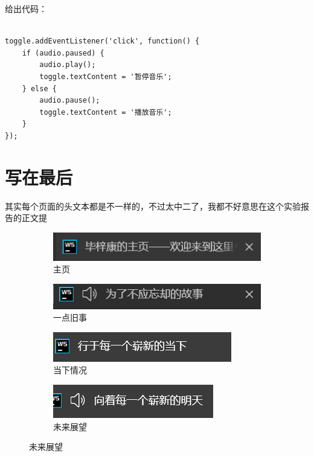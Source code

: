 \documentclass[supercite]{Experimental_Report}
\theoremstyle{definition}
\begin{document}
给出代码：
\begin{verbatim}
	
toggle.addEventListener('click', function() {
	if (audio.paused) {
		audio.play();
		toggle.textContent = '暂停音乐';
	} else {
		audio.pause();
		toggle.textContent = '播放音乐';
	}
});
\end{verbatim}

\newpage

\apendix

\section{写在最后}
其实每个页面的头文本都是不一样的，不过太中二了，我都不好意思在这个实验报告的正文提
\begin{figure}[htb] %
	\centering
	\begin{subfigure}[b]{0.4\textwidth}
		\includegraphics[width=\textwidth]{images/e1.png}
		\caption{主页}
		\label{fig8-1}
	\end{subfigure}
	\hfill %
	\begin{subfigure}[b]{0.4\textwidth}
		\includegraphics[width=\textwidth]{images/e2.png}
		\caption{一点旧事}
		\label{fig8-2}
	\end{subfigure}
	
	\begin{subfigure}[b]{0.4\textwidth}
		\includegraphics[width=\textwidth]{images/e5.png}
		\caption{当下情况}
		\label{fig8-3}
	\end{subfigure}
	\hfill
	\begin{subfigure}[b]{0.4\textwidth}
		\includegraphics[width=\textwidth]{images/e6.png}
		\caption{未来展望}
		\label{fig8-4}
	\end{subfigure}
	

\end{figure}
\end{document}
